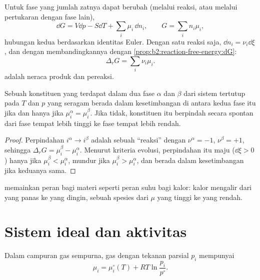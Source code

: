 Untuk fase yang jumlah zatnya dapat berubah (melalui reaksi, atau melalui
pertukaran dengan fase lain),
\[
  \dd G = V\dd p - S\dd T + \sum_i\mu_i\,\dd n_i ,\qquad G = \sum_i n_i\mu_i ,
\]
hubungan kedua berdasarkan identitas Euler. Dengan satu reaksi saja,
$\dd n_i =
\nu_i\dd\xi$, dan dengan membandingkannya dengan
\cref{prop:b2:reaction-free-energy:dG}:
\[
  \Delta_r G = \sum_i\nu_i\mu_i .
\]
 adalah neraca  produk dan  pereaksi.

\begin{theorem}\label{thm:b2:chemical-potential:phase-equilibrium}
Sebuah konstituen yang terdapat dalam dua fase $\alpha$ dan $\beta$ dari
sistem tertutup pada $T$ dan $p$ yang seragam berada dalam kesetimbangan
di antara kedua fase itu jika dan hanya jika $\mu_i^\alpha = \mu_i^\beta$.
Jika tidak, konstituen itu berpindah secara spontan dari fase tempat
 lebih tinggi ke fase tempat  lebih
rendah.
\end{theorem}

\begin{proof}
Perpindahan $i^\alpha \to i^\beta$ adalah sebuah ``reaksi'' dengan
$\nu^\alpha = -1$, $\nu^\beta = +1$, sehingga $\Delta_r G = \mu_i^\beta - \mu_i^\alpha$. Menurut kriteria evolusi, perpindahan itu maju
($\dd\xi > 0$) hanya jika $\mu_i^\beta <
\mu_i^\alpha$, mundur jika
$\mu_i^\beta > \mu_i^\alpha$, dan berada dalam kesetimbangan jika keduanya
sama.
\end{proof}

 memainkan peran bagi materi seperti peran suhu bagi kalor:
kalor mengalir dari yang panas ke yang dingin, sebuah spesies dari $\mu$
yang tinggi ke yang rendah.

\section{Sistem ideal dan aktivitas}

\begin{proposition}\label{prop:b2:chemical-potential:mu-gas}
Dalam campuran gas sempurna, gas dengan tekanan parsial $p_i$ mempunyai
\[
  \mu_i = \mu_i^\circ(T) + RT\ln\frac{p_i}{p^\circ} .
\]
\end{proposition}

